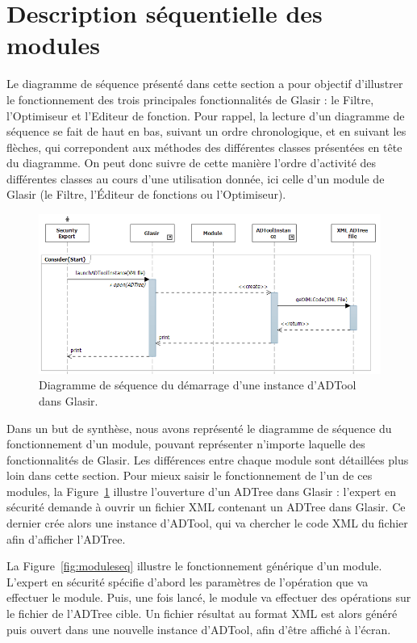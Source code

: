 \section{Description séquentielle des modules}
    \label{sec:modules}
    
Le diagramme de séquence présenté dans cette section a pour objectif d'illustrer le fonctionnement des trois principales fonctionnalités de Glasir : le Filtre, l'Optimiseur et l'Editeur de fonction. Pour rappel, la lecture d'un diagramme de séquence se fait de haut en bas, suivant un ordre chronologique, et en suivant les flèches, qui correpondent aux méthodes des différentes classes présentées en tête du diagramme. On peut donc suivre de cette manière l'ordre d'activité des différentes classes au cours d'une utilisation donnée, ici celle d'un module de Glasir (le Filtre, l'Éditeur de fonctions ou l'Optimiseur).

	    \begin{figure}[H]
	        \centering
	        \includegraphics[height=0.45\textwidth]{figure/startseqdiag.png}
	        \caption{Diagramme de séquence du démarrage d'une instance d'ADTool dans Glasir.}
	        \label{fig:start}
	    \end{figure}

Dans un but de synthèse, nous avons représenté le diagramme de séquence du fonctionnement d'un module, pouvant représenter n'importe laquelle des fonctionnalités de Glasir. Les différences entre chaque module sont détaillées plus loin dans cette section. Pour mieux saisir le fonctionnement de l'un de ces modules, la {\sc Figure}~{\ref{fig:start}} illustre l'ouverture d'un ADTree dans Glasir : l'expert en sécurité demande à ouvrir un fichier XML contenant un ADTree dans Glasir. Ce dernier crée alors une instance d'ADTool, qui va chercher le code XML du fichier afin d'afficher l'ADTree.

	    La {\sc Figure}~{\ref{fig:moduleseq}} illustre le fonctionnement générique d'un module. L'expert en sécurité spécifie d'abord les paramètres de l'opération que va effectuer le module. Puis, une fois lancé, le module va effectuer des opérations sur le fichier de l'ADTree cible. Un fichier résultat au format XML est alors généré puis ouvert dans une nouvelle instance d'ADTool, afin d'être affiché à l'écran. 

